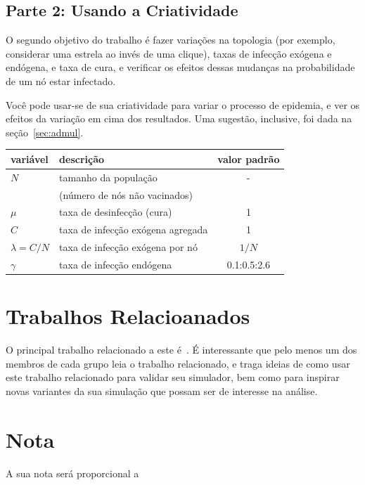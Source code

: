 \documentclass[a4paper]{article}
\begin{document}
\subsection{Parte 2: Usando a Criatividade}

\label{sec:contribuicoes2}

O segundo objetivo do trabalho é fazer variações na topologia (por exemplo, considerar uma estrela ao invés de uma clique), taxas de infecção exógena e endógena, e taxa de cura, e verificar os efeitos dessas mudanças na probabilidade de um nó estar infectado.

Você pode usar-se de sua criatividade para variar o processo de epidemia, e ver os efeitos da variação em cima dos resultados.  Uma sugestão, inclusive, foi dada na seção~\ref{sec:admul}.


\begin{table}
\center
\begin{tabular}{l|l|c}
	\hline 
	variável 	& descrição  			& valor padrão \\ 
	\hline 
	$N$ 		& tamanho da população 	& - \\
	& (número de nós não vacinados) 	& \\
	$\mu$ 		& taxa de desinfecção (cura) 		&  1 \\
	$C$			& taxa de infecção exógena agregada & 1 \\
	$\lambda = C/N$ 	& taxa de infecção exógena por nó & $1/N$\\
	$\gamma$ 	& taxa de infecção endógena & 0.1:0.5:2.6 \\
	\hline
\end{tabular}
\end{table}


\section{Trabalhos Relacioanados}


O principal trabalho relacionado a este é~\cite{zhang2014diffusion}.  É interessante que pelo menos um dos membros de cada grupo leia o trabalho relacionado, e traga ideias de como usar este trabalho relacionado para validar seu simulador, bem como para inspirar novas variantes da sua simulação que possam ser de interesse na análise.


\section{Nota}

A sua nota será proporcional a
\end{document}
